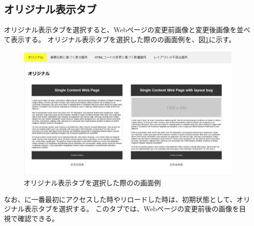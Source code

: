 \subsection{オリジナル表示タブ}\label{subsec:original_tab}
オリジナル表示タブを選択すると、Webページの変更前画像と変更後画像を並べて表示する。
オリジナル表示タブを選択した際の\toolName の画面例を、図\ref{fig: Appearance_original_tab}に示す。
\begin{figure}[tp]
    \begin{center}
        \includegraphics[width=1.0\columnwidth]{image/3_original_tab2.png}
        \caption{オリジナル表示タブを選択した際の\toolName の画面例}
        \label{fig: Appearance_original_tab}
    \end{center}
\end{figure}
なお、\toolName に一番最初にアクセスした時やリロードした時は、初期状態として、オリジナル表示タブを選択する。
このタブでは、Webページの変更前後の画像を目視で確認できる。

